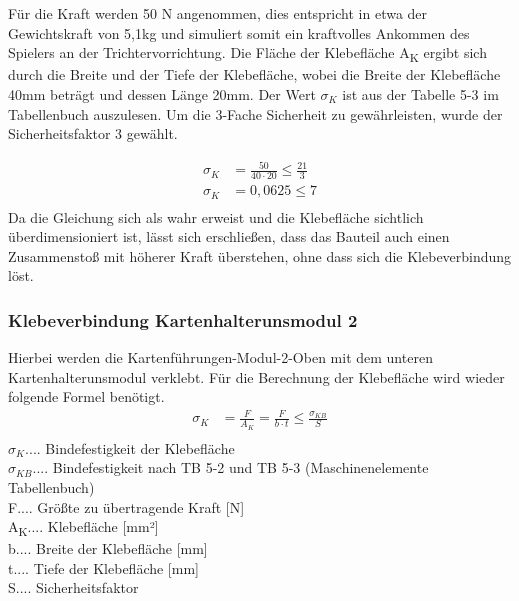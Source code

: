 Für die Kraft werden 50 N angenommen, dies entspricht in etwa der Gewichtskraft von 5,1kg
und simuliert somit ein kraftvolles Ankommen des Spielers an der Trichtervorrichtung.
Die Fläche der Klebefläche A\textsubscript{K} ergibt sich durch die Breite und der Tiefe der Klebefläche, wobei
die Breite der Klebefläche  40mm beträgt und dessen Länge 20mm.
Der Wert $\sigma_{K}$ ist aus der Tabelle 5-3 im Tabellenbuch  auszulesen.
Um die 3-Fache Sicherheit zu gewährleisten, wurde der Sicherheitsfaktor 3 gewählt.

\begin{align*}
\sigma _{K} &= \frac{50}{40\cdot 20}\leq \frac{21}{3}\\
\sigma _{K} &= 0,0625\leq 7\\
\end{align*}
Da die Gleichung sich als wahr erweist und die Klebefläche sichtlich überdimensioniert ist, lässt sich erschließen,
dass das Bauteil auch einen Zusammenstoß mit höherer Kraft überstehen, ohne dass sich die Klebeverbindung löst.

\subsubsection{Klebeverbindung Kartenhalterunsmodul 2} \label{subsubsec:KlebMod2}
Hierbei werden die Kartenführungen-Modul-2-Oben mit dem unteren Kartenhalterunsmodul verklebt.
Für die Berechnung der Klebefläche wird wieder folgende Formel benötigt.
\begin{align*}
\sigma _{K} &= \frac{F}{A_{K}} = \frac{F}{b\cdot t}\leq \frac{\sigma _{KB}}{S}\\
\end{align*}
$\sigma_{K}$.... Bindefestigkeit der Klebefläche \\
$\sigma_{KB}$.... Bindefestigkeit nach TB 5-2 und TB 5-3 (Maschinenelemente Tabellenbuch)\\
F.... Größte zu übertragende Kraft [N]\\
A\textsubscript{K}.... Klebefläche [mm²]\\
b.... Breite der Klebefläche [mm]\\
t.... Tiefe der Klebefläche [mm]\\
S.... Sicherheitsfaktor\\

